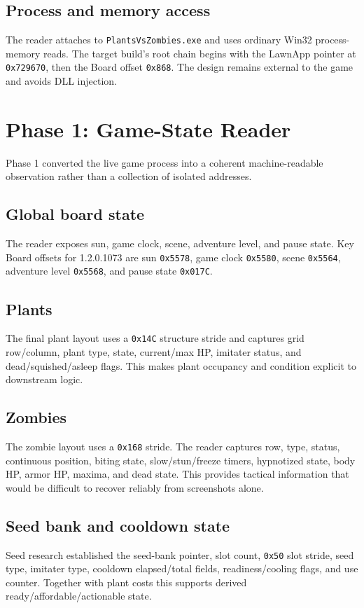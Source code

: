 \documentclass[11pt,a4paper]{article}
\begin{document}
\subsection{Process and memory access}
The reader attaches to \texttt{PlantsVsZombies.exe} and uses ordinary Win32 process-memory reads. The target build's root chain begins with the LawnApp pointer at \texttt{0x729670}, then the Board offset \texttt{0x868}. The design remains external to the game and avoids DLL injection.
\section{Phase 1: Game-State Reader}
Phase 1 converted the live game process into a coherent machine-readable observation rather than a collection of isolated addresses.
\subsection{Global board state}
The reader exposes sun, game clock, scene, adventure level, and pause state. Key Board offsets for 1.2.0.1073 are sun \texttt{0x5578}, game clock \texttt{0x5580}, scene \texttt{0x5564}, adventure level \texttt{0x5568}, and pause state \texttt{0x017C}.
\subsection{Plants}
The final plant layout uses a \texttt{0x14C} structure stride and captures grid row/column, plant type, state, current/max HP, imitater status, and dead/squished/asleep flags. This makes plant occupancy and condition explicit to downstream logic.
\subsection{Zombies}
The zombie layout uses a \texttt{0x168} stride. The reader captures row, type, status, continuous position, biting state, slow/stun/freeze timers, hypnotized state, body HP, armor HP, maxima, and dead state. This provides tactical information that would be difficult to recover reliably from screenshots alone.
\subsection{Seed bank and cooldown state}
Seed research established the seed-bank pointer, slot count, \texttt{0x50} slot stride, seed type, imitater type, cooldown elapsed/total fields, readiness/cooling flags, and use counter. Together with plant costs this supports derived ready/affordable/actionable state.
\end{document}

